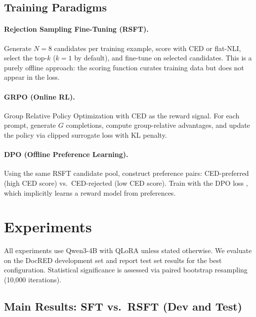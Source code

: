 \documentclass[11pt,a4paper]{article}
\begin{document}
\subsection{Training Paradigms}

\paragraph{Rejection Sampling Fine-Tuning (RSFT).}
Generate $N{=}8$ candidates per training example, score with CED or flat-NLI, select the top-$k$ ($k{=}1$ by default), and fine-tune on selected candidates. This is a purely offline approach: the scoring function curates training data but does not appear in the loss.

\paragraph{GRPO (Online RL).}
Group Relative Policy Optimization \cite{shao2024deepseekmath} with CED as the reward signal. For each prompt, generate $G$ completions, compute group-relative advantages, and update the policy via clipped surrogate loss with KL penalty.

\paragraph{DPO (Offline Preference Learning).}
Using the same RSFT candidate pool, construct preference pairs: CED-preferred (high CED score) vs.\ CED-rejected (low CED score). Train with the DPO loss \cite{rafailov2024direct}, which implicitly learns a reward model from preferences.

\section{Experiments}
\label{sec:experiments}

All experiments use Qwen3-4B with QLoRA unless stated otherwise. We evaluate on the DocRED development set and report test set results for the best configuration. Statistical significance is assessed via paired bootstrap resampling (10,000 iterations).

\subsection{Main Results: SFT vs.\ RSFT (Dev and Test)}
\label{sec:main_results}
\end{document}
